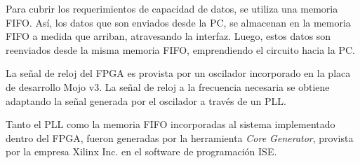 Para cubrir los requerimientos de capacidad de datos, se utiliza una memoria FIFO. Así, los datos que son enviados desde la PC, se almacenan en la memoria FIFO a medida que arriban, atravesando la interfaz. Luego, estos datos son reenviados desde la misma memoria FIFO, emprendiendo el circuito hacia la PC.

La señal de reloj del FPGA es provista por un oscilador incorporado en la placa de desarrollo Mojo v3. La señal de reloj a la frecuencia necesaria se obtiene adaptando la señal generada por el oscilador a través de un PLL.

Tanto el PLL como la memoria FIFO incorporadas al sistema implementado dentro del FPGA, fueron generadas por la herramienta \textit{Core Generator}, provista por la empresa Xilinx Inc. en el software de programación ISE.

